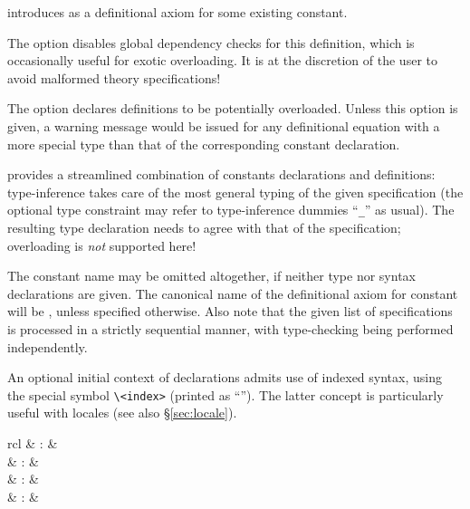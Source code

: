\begin{isabellebody}
\begin{isamarkuptext}
\begin{descr}
  \item [\isa{\isacommand{defs}}~\isa{name{\isacharcolon}\ eqn}] introduces 
  as a definitional axiom for some existing constant.
  
  The  option disables global dependency checks
  for this definition, which is occasionally useful for exotic
  overloading.  It is at the discretion of the user to avoid malformed
  theory specifications!
  
  The  option declares definitions to be
  potentially overloaded.  Unless this option is given, a warning
  message would be issued for any definitional equation with a more
  special type than that of the corresponding constant declaration.
  
  \item [\isa{\isacommand{constdefs}}] provides a streamlined combination of
  constants declarations and definitions: type-inference takes care of
  the most general typing of the given specification (the optional
  type constraint may refer to type-inference dummies ``\verb|_|'' as usual).  The resulting type declaration needs to agree with
  that of the specification; overloading is \emph{not} supported here!
  
  The constant name may be omitted altogether, if neither type nor
  syntax declarations are given.  The canonical name of the
  definitional axiom for constant  will be ,
  unless specified otherwise.  Also note that the given list of
  specifications is processed in a strictly sequential manner, with
  type-checking being performed independently.
  
  An optional initial context of  declarations
  admits use of indexed syntax, using the special symbol \verb|\<index>| (printed as ``\isa{{\isasymindex}}'').  The latter concept is
  particularly useful with locales (see also \S\ref{sec:locale}).

  \end{descr}%
\end{isamarkuptext}%
\isamarkuptrue%
%
\isamarkuptrue%
%
\begin{isamarkuptext}%
\begin{matharray}{rcl}
     & : &  \\
     & : &  \\
     & : &  \\
     & : &  \\
  \end{matharray}


\end{isamarkuptext}
\end{isabellebody}
